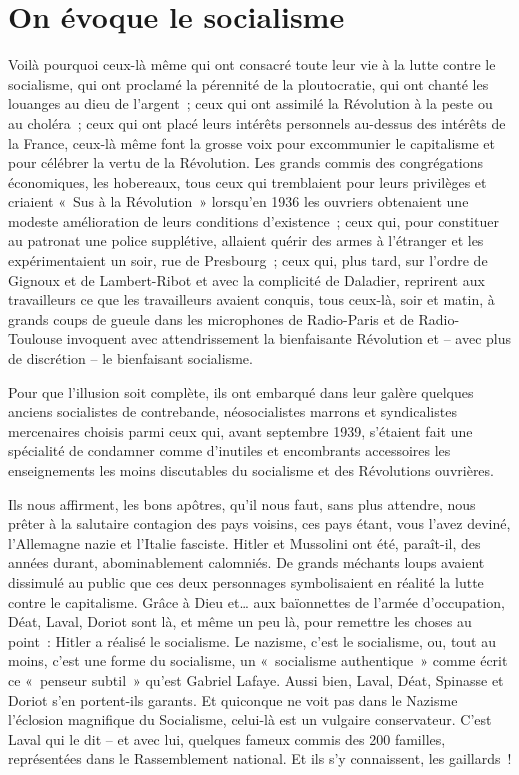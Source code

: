 \documentclass[french,twoside]{book} %
\begin{document}
\section[{On évoque le socialisme}]{On évoque le socialisme}
\noindent Voilà pourquoi ceux-là même qui ont consacré toute leur vie à la lutte contre le socialisme, qui ont proclamé la pérennité de la ploutocratie, qui ont chanté les louanges au dieu de l’argent ; ceux qui ont assimilé la Révolution à la peste ou au choléra ; ceux qui ont placé leurs intérêts personnels au-dessus des intérêts de la France, ceux-là même font la grosse voix pour excommunier le capitalisme et pour célébrer la vertu de la Révolution. Les grands commis des congrégations économiques, les hobereaux, tous ceux qui tremblaient pour leurs privilèges et criaient « Sus à la Révolution » lorsqu’en 1936 les ouvriers obtenaient une modeste amélioration de leurs conditions d’existence ; ceux qui, pour constituer au patronat une police supplétive, allaient quérir des armes à l’étranger et les expérimentaient un soir, rue de Presbourg ; ceux qui, plus tard, sur l’ordre de Gignoux et de Lambert-Ribot et avec la complicité de Daladier, reprirent aux travailleurs ce que les travailleurs avaient conquis, tous ceux-là, soir et matin, à grands coups de gueule dans les microphones de Radio-Paris et de Radio-Toulouse invoquent avec attendrissement la bienfaisante Révolution et – avec plus de discrétion – le bienfaisant socialisme.\par
Pour que l’illusion soit complète, ils ont embarqué dans leur galère quelques anciens socialistes de contrebande, néosocialistes marrons et syndicalistes mercenaires choisis parmi ceux qui, avant septembre 1939, s’étaient fait une spécialité de condamner comme d’inutiles et encombrants accessoires les enseignements les moins discutables du socialisme et des Révolutions ouvrières.\par
Ils nous affirment, les bons apôtres, qu’il nous faut, sans plus attendre, nous prêter à la salutaire contagion des pays voisins, ces pays étant, vous l’avez deviné, l’Allemagne nazie et l’Italie fasciste. Hitler et Mussolini ont été, paraît-il, des années durant, abominablement calomniés. De grands méchants loups avaient dissimulé au public que ces deux personnages symbolisaient en réalité la lutte contre le capitalisme. Grâce à Dieu et… aux baïonnettes de l’armée d’occupation, Déat, Laval, Doriot sont là, et même un peu là, pour remettre les choses au point : Hitler a réalisé le socialisme. Le nazisme, c’est le socialisme, ou, tout au moins, c’est une forme du socialisme, un « socialisme authentique » comme écrit ce « penseur subtil » qu’est Gabriel Lafaye. Aussi bien, Laval, Déat, Spinasse et Doriot s’en portent-ils garants. Et quiconque ne voit pas dans le Nazisme l’éclosion magnifique du Socialisme, celui-là est un vulgaire conservateur. C’est Laval qui le dit – et avec lui, quelques fameux commis des 200 familles, représentées dans le Rassemblement national. Et ils s’y connaissent, les gaillards !
\end{document}
